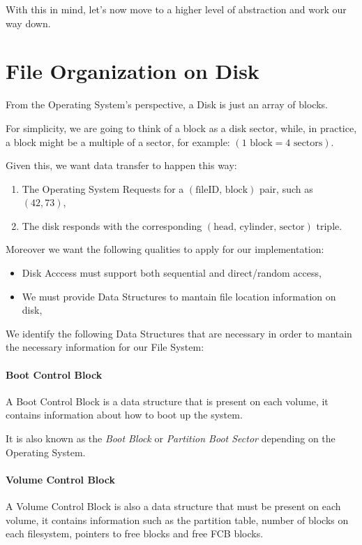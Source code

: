 \documentclass[openright, twoside]{report}
\theoremstyle{definition}
\theoremstyle{example}
\begin{document}
With this in mind, let's now move to a higher level of abstraction and work our way down.

\section{File Organization on Disk}
From the Operating System's perspective, a Disk is just an array of blocks.

For simplicity, we are going to think of a block as a disk sector, while, in practice, 
a block might be a multiple of a sector, for example: $(1 \text{ block} = 4 \text{ sectors})$.

Given this, we want data transfer to happen this way:

\begin{enumerate}
	\item The Operating System Requests for a $(\text{fileID, block})$ pair, such as $(42, 73)$,
	\item The disk responds with the corresponding $(\text{head, cylinder, sector})$ triple.
\end{enumerate}

Moreover we want the following qualities to apply for our implementation:
\begin{itemize}
	\item Disk Acccess must support both sequential and direct/random access,
	\item We must provide Data Structures to mantain file location information on disk,
\end{itemize}

We identify the following Data Structures that are necessary in order to mantain the 
necessary information for our File System:

\paragraph{Boot Control Block}
A Boot Control Block is a data structure that is present on each volume, it 
contains information about how to boot up the system.

It is also known as the \emph{Boot Block} 
or \emph{Partition Boot Sector} depending on the Operating System.

\paragraph{Volume Control Block}
A Volume Control Block is also a data structure that must be present on each volume,
it contains information such as the partition table, number of blocks on each filesystem,
pointers to free blocks and free FCB blocks.
\end{document}

